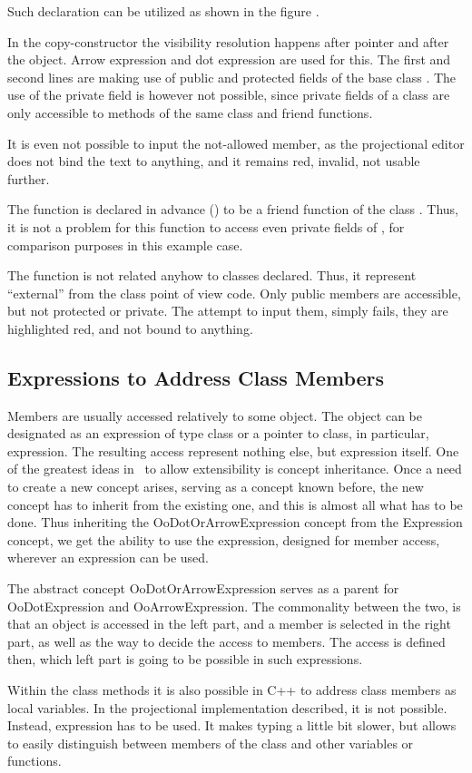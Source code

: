 Such declaration can be utilized as shown in the figure .


In the copy-constructor the visibility resolution happens after  pointer
and after the  object. Arrow expression and dot expression are used for
this. The first and second lines are making use of public and protected fields of 
the base class . The use of the private field is however not possible, since
private fields of a class are only accessible to methods of the same class and
friend functions. 

It is even not possible to input the not-allowed member, as the projectional editor
does not bind the text to anything, and it remains red, invalid, not usable further.


The  function is declared in advance () to be a friend 
function of the class . Thus, it is not a problem for this function to access
even private fields of , for comparison purposes in this example case.

The function  is not related anyhow to classes declared. Thus,
it represent ``external'' from the class point of view code. Only public members
are accessible, but not protected or private. The attempt to input them, simply
fails, they are highlighted red, and not bound to anything.


\subsection{Expressions to Address Class Members}


Members are usually accessed relatively to some object. The object can be designated as an expression of type class or a pointer to class,
in particular,  expression. The resulting access represent nothing else, but expression itself. 
One of the greatest ideas in \jbmps\ to allow extensibility is concept inheritance. Once a need to create a new concept arises, serving as a 
concept known before, the new concept has to inherit from the existing one, and this is almost all what has to be done.
Thus inheriting the OoDotOrArrowExpression concept from the Expression concept, we get the ability to use the expression, designed for member 
access, wherever an expression can be used. 

The abstract concept OoDotOrArrowExpression serves as a parent for OoDotExpression and OoArrowExpression. The commonality between the two, is
that an object is accessed in the left part, and a member is selected in the right part, as well as the way to decide the access to members.
The access is defined then, which left part is going to be possible in such expressions.


Within the class methods it is also possible in C++ to address class members as local variables. In the projectional implementation
described, it is not possible. Instead,  expression has to be used. It makes typing a little bit slower, but allows to
easily distinguish between members of the class and other variables or functions.
